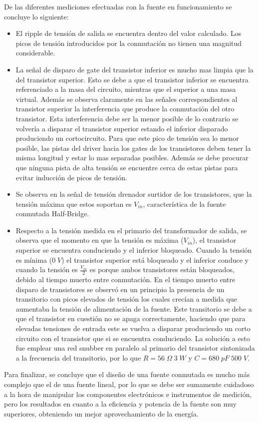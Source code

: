 \documentclass[11pt, a4paper]{article}
\begin{document}
De las diferentes mediciones efectuadas con la fuente en funcionamiento se concluye lo siguiente:
\begin{itemize}
	\item El ripple de tensión de salida se encuentra dentro del valor calculado. Los picos de tensión introducidos por la conmutación no tienen una magnitud considerable.
	\item La señal de disparo de gate del transistor inferior es mucho mas limpia que la del transistor superior. Esto se debe a que el transistor inferior se encuentra referenciado a la masa del circuito, mientras que el superior a una masa virtual. Además se observa claramente en las señales correspondientes al transistor superior la interferencia que produce la conmutación del otro transistor. Esta interferencia debe ser la menor posible de lo contrario se volvería a disparar el transistor superior estando el inferior disparado produciendo un cortocircuito. Para que este pico de tensión sea lo menor posible, las pistas del driver hacia los gates de los transistores deben tener la misma longitud y estar lo mas separadas posibles. Además se debe procurar que ninguna pista de alta tensión se encuentre cerca de estas pistas para evitar inducción de picos de tensión.
	\item Se observa en la señal de tensión drenador surtidor de los transistores, que la tensión máxima que estos soportan es $V_{in}$, característica de la fuente conmutada Half-Bridge.
	\item Respecto a la tensión medida en el primario del transformador de salida, se observa que el momento en que la tensión es máxima ($V_{in}$), el transistor superior se encuentra conduciendo y el inferior bloqueado. Cuando la tensión es mínima ($0 \; V$) el transistor superior está bloqueado y el inferior conduce y cuando la tensión es $\frac{V_{in}}{2}$ es porque ambos transistores están bloqueados, debido al tiempo muerto entre conmutación. En el tiempo muerto entre disparo de transistores se observó en un principio la presencia de un transitorio con picos elevados de tensión los cuales crecían a medida que aumentaba la tensión de alimentación de la fuente. Este transitorio se debe a que el transistor en cuestión no se apaga correctamente, haciendo que para elevadas tensiones de entrada este se vuelva a disparar produciendo un corto circuito con el transistor que si se encuentra conduciendo. La solución a esto fue emplear una red snubber en paralelo al primario del transistor sintonizada a la frecuencia del transitorio, por lo que $R = 56 \; \Omega \; 3 \; W$ y $C = 680 \; pF \; 500 \; V$. 
\end{itemize}

Para finalizar, se concluye que el diseño de una fuente conmutada es mucho más complejo que el de una fuente lineal, por lo que se debe ser sumamente cuidadoso a la hora de manipular los componentes electrónicos e instrumentos de medición, pero los resultados en cuanto a la eficiencia y potencia de la fuente son muy superiores, obteniendo un mejor aprovechamiento de la energía.
\end{document}

